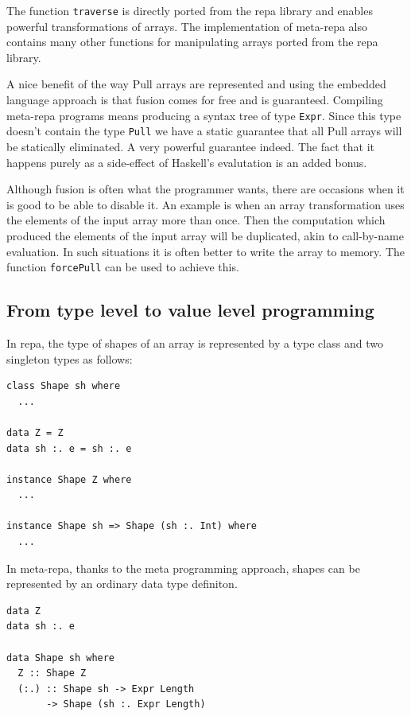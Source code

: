 \documentclass[preprint]{sigplanconf}
\begin{document}
The function \texttt{traverse} is directly ported from the repa library
and enables powerful transformations of arrays. The implementation of
meta-repa also contains many other functions for manipulating arrays
ported from the repa library.

A nice benefit of the way Pull arrays are represented and using the
embedded language approach is that fusion comes for free and is
guaranteed. Compiling meta-repa programs means producing a syntax tree
of type \texttt{Expr}. Since this type doesn't contain the type
\texttt{Pull} we have a static guarantee that all Pull arrays will be
statically eliminated. A very powerful guarantee indeed. The fact that
it happens purely as a side-effect of Haskell's evalutation is an added
bonus.

Although fusion is often what the programmer wants, there are occasions
when it is good to be able to disable it. An example is when an array
transformation uses the elements of the input array more than once. Then
the computation which produced the elements of the input array will be
duplicated, akin to call-by-name evaluation. In such situations it is
often better to write the array to memory. The function
\texttt{forcePull} can be used to achieve this.

\subsection{From type level to value level programming}

\label{sec:shape}

In repa, the type of shapes of an array is represented by a type class
and two singleton types as follows:

\begin{verbatim}
class Shape sh where
  ...

data Z = Z
data sh :. e = sh :. e

instance Shape Z where
  ...

instance Shape sh => Shape (sh :. Int) where
  ...
\end{verbatim}

In meta-repa, thanks to the meta programming approach, shapes can be
represented by an ordinary data type definiton.

\begin{verbatim}
data Z
data sh :. e

data Shape sh where
  Z :: Shape Z
  (:.) :: Shape sh -> Expr Length
       -> Shape (sh :. Expr Length)
\end{verbatim}
\end{document}
